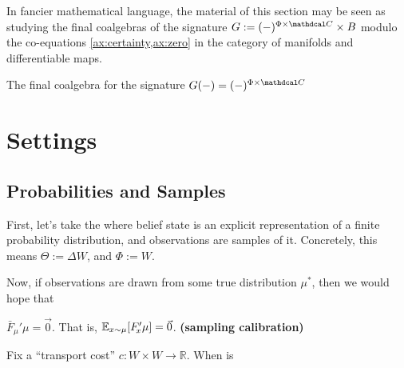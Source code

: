 \documentclass{article}
\def\confdom{\mathdcal C}
\begin{document}
In fancier mathematical language, the material of this section may be seen as studying the final coalgebras of the signature 
$
	G := (-)^{\Phi \times \confdom} \times B
$
modulo the co-equations \cref{ax:certainty,ax:zero} in the category of manifolds and differentiable maps.


\begin{prop}
	The final coalgebra for the signature $G(-) = (-)^{\Phi \times \confdom}$
\end{prop}


\section{Settings}
\subsection{Probabilities and Samples}

First, let's take the where belief state is an explicit representation of a finite probability distribution, and observations are samples of it. 
Concretely, this means $\Theta := \Delta W$, and $\Phi := W$. 

Now, if observations are drawn from some true distribution $\mu^*$, then we would hope that 

\begin{CFaxioms}
	\item  $\bar F_{\!\mu}'\mu = \vec 0$. 
	That is, $\operatorname*{\mathbb{E}}_{x \sim \mu}[ F'_{\!x}\mu] = \vec 0$.
	\hfill \textbf{(sampling calibration)} \label{ax:sample-calibration}
\end{CFaxioms}

\begin{computation}
    Fix a ``transport cost'' $c : W\times W \to \mathbb R$. 
    When is 
    \tcblower
\end{computation}
\end{document}
